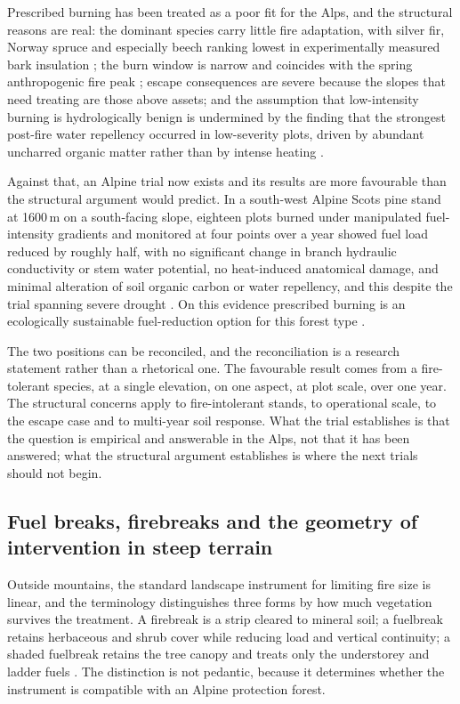 \documentclass[11pt,a4paper]{article}
\begin{document}
Prescribed burning has been treated as a poor fit for the Alps, and the structural reasons are real: the dominant species carry little fire adaptation, with silver fir, Norway spruce and especially beech ranking lowest in experimentally measured bark insulation \citep{mutterer_bark_2026, dupire_vulnerability_2019}; the burn window is narrow and coincides with the spring anthropogenic fire peak \citep{muller_forest_2020}; escape consequences are severe because the slopes that need treating are those above assets; and the assumption that low-intensity burning is hydrologically benign is undermined by the finding that the strongest post-fire water repellency occurred in low-severity plots, driven by abundant uncharred organic matter rather than by intense heating \citep{negri_wildfire_2026}.

Against that, an Alpine trial now exists and its results are more favourable than the structural argument would predict. In a south-west Alpine Scots pine stand at 1600\,m on a south-facing slope, eighteen plots burned under manipulated fuel-intensity gradients and monitored at four points over a year showed fuel load reduced by roughly half, with no significant change in branch hydraulic conductivity or stem water potential, no heat-induced anatomical damage, and minimal alteration of soil organic carbon or water repellency, and this despite the trial spanning severe drought \citep{gamba_prescribed_2025}. On this evidence prescribed burning is an ecologically sustainable fuel-reduction option for this forest type \citep{gamba_prescribed_2025}.

The two positions can be reconciled, and the reconciliation is a research statement rather than a rhetorical one. The favourable result comes from a fire-tolerant species, at a single elevation, on one aspect, at plot scale, over one year. The structural concerns apply to fire-intolerant stands, to operational scale, to the escape case and to multi-year soil response. What the trial establishes is that the question is empirical and answerable in the Alps, not that it has been answered; what the structural argument establishes is where the next trials should not begin.

\subsection{Fuel breaks, firebreaks and the geometry of intervention in steep terrain}
\label{sec:fuelbreaks}

Outside mountains, the standard landscape instrument for limiting fire size is linear, and the terminology distinguishes three forms by how much vegetation survives the treatment. A firebreak is a strip cleared to mineral soil; a fuelbreak retains herbaceous and shrub cover while reducing load and vertical continuity; a shaded fuelbreak retains the tree canopy and treats only the understorey and ladder fuels \citep{ascoli_firebreak_2018}. The distinction is not pedantic, because it determines whether the instrument is compatible with an Alpine protection forest.
\end{document}
